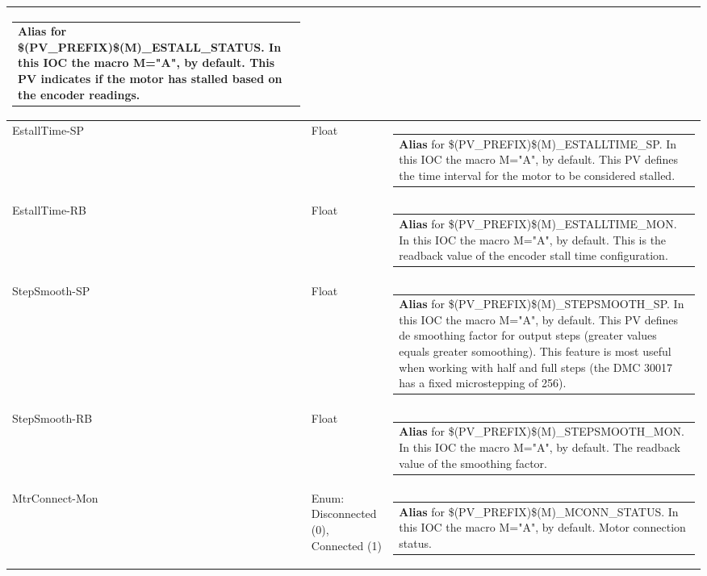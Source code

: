 \documentclass[openany]{article}
\begin{document}
\begin{longtable}{| m{4.5cm} m{2.5cm}  m{8.5cm} |}
\begin{tabular}{@{}m{6cm}@{}}
                \textbf{\color{blue} Alias} for \$(PV\_PREFIX)\$(M)\_ESTALL\_STATUS. In this IOC the macro M="A", by default. This PV indicates if the motor has stalled based on the encoder readings.
            \end{tabular} \hypertarget{pv:estall-time}{}\\ \hline
        EstallTime-SP & Float & \begin{tabular}{@{}m{6cm}@{}}
                \textbf{\color{blue} Alias} for \$(PV\_PREFIX)\$(M)\_ESTALLTIME\_SP. In this IOC the macro M="A", by default. This PV defines the time interval for the motor to be considered stalled.
            \end{tabular} \hypertarget{}{}\\ \hline
        EstallTime-RB & Float & \begin{tabular}{@{}m{6cm}@{}}
                \textbf{\color{blue} Alias} for \$(PV\_PREFIX)\$(M)\_ESTALLTIME\_MON. In this IOC the macro M="A", by default. This is the readback value of the encoder stall time configuration.
            \end{tabular} \hypertarget{pv:step-smooth}{}\\ \hline
        StepSmooth-SP & Float & \begin{tabular}{@{}m{6cm}@{}}
                \textbf{\color{blue} Alias} for \$(PV\_PREFIX)\$(M)\_STEPSMOOTH\_SP. In this IOC the macro M="A", by default. This PV defines de smoothing factor for output steps (greater values equals greater somoothing). This feature is most useful when working with half and full steps (the DMC 30017 has a fixed microstepping of 256).
            \end{tabular} \hypertarget{}{}\\ \hline
        StepSmooth-RB & Float & \begin{tabular}{@{}m{6cm}@{}}
                \textbf{\color{blue} Alias} for \$(PV\_PREFIX)\$(M)\_STEPSMOOTH\_MON. In this IOC the macro M="A", by default. The readback value of the smoothing factor.
            \end{tabular} \hypertarget{pv:mtr-connect-mon}{}\\ \hline
        MtrConnect-Mon & Enum: Disconnected (0), Connected (1) & \begin{tabular}{@{}m{6cm}@{}}
                \textbf{\color{blue} Alias} for \$(PV\_PREFIX)\$(M)\_MCONN\_STATUS. In this IOC the macro M="A", by default. Motor connection status.

\end{tabular}
\end{longtable}
\end{document}
